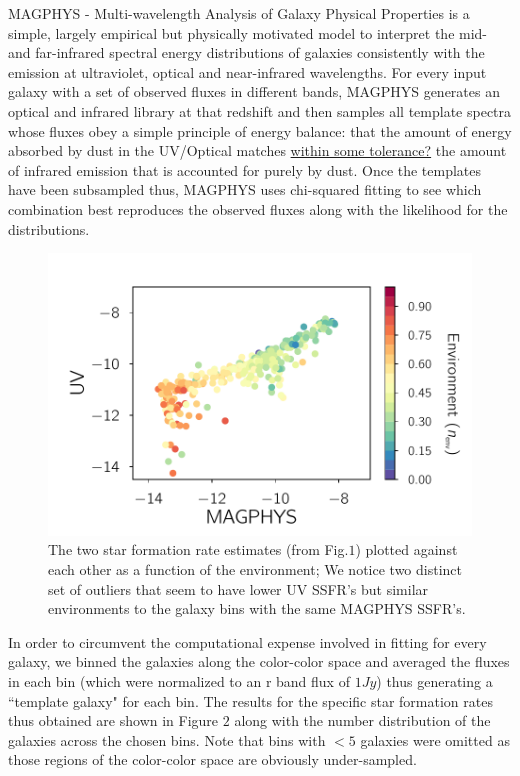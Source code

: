 \documentclass[iop]{emulateapj}
\begin{document}
MAGPHYS - Multi-wavelength Analysis of Galaxy Physical Properties \cite[]{daC08}  is a simple, largely empirical but physically motivated model to interpret the mid- and far-infrared spectral energy distributions of galaxies consistently with the emission at ultraviolet, optical and near-infrared wavelengths. For every input galaxy with a set of observed fluxes in different bands, MAGPHYS generates an optical and infrared library at that redshift and then samples all template spectra whose fluxes obey a simple principle of energy balance: that the amount of energy absorbed by dust in the UV/Optical matches \underline{within some tolerance?} the amount of infrared emission that is accounted for purely by dust. Once the templates have been subsampled thus, MAGPHYS uses chi-squared fitting to see which combination best reproduces the observed fluxes along with the likelihood for the distributions.\\

\begin{figure}
	\centering
		\includegraphics[width = 9 cm, height = 6.0 cm]{env_plot.pdf}
	\caption{The two star formation rate estimates (from Fig.$1$) plotted against each other as a function of the environment; We notice two distinct set of outliers that seem to have lower UV SSFR's but similar environments to the galaxy bins with the same MAGPHYS SSFR's.} 
\end{figure}

In order to circumvent the computational expense involved in fitting for every galaxy, we binned the galaxies along the color-color space and averaged the fluxes in each bin (which were normalized to an r band flux of $1 Jy$) thus generating a ``template galaxy" for each bin. The results for the specific star formation rates thus obtained are shown in Figure $2$ along with the number distribution of the galaxies across the chosen bins. Note that bins with $< 5$ galaxies were omitted as those regions of the color-color space are obviously under-sampled. \\
\end{document}
